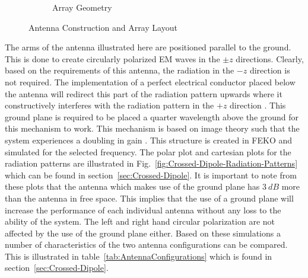 \documentclass[11pt]{witseiepaper}
\begin{document}
\begin{bibunit}[witseie]
\begin{figure}[htb]
\begin{subfigure}{.3\textwidth}
            \caption{Array Geometry}
            \label{fig:ArrayGeometry}  
            \end{subfigure}
\caption{Antenna Construction and Array Layout}
\label{fig:AntennaConstructionArrayLayout}
\end{figure}
The arms of the antenna illustrated here are positioned parallel to the ground. This is done to create circularly polarized EM waves in the $\pm z$ directions.
Clearly, based on the requirements of this antenna, the radiation in the $-z$ direction is not required. The implementation of a perfect electrical conductor placed below the antenna will redirect this part of the radiation pattern upwards where it constructively interferes with the radiation pattern in the $+z$ direction \cite[p.~110-111]{IEEECrossedDipole}. This ground plane is required to be placed a quarter wavelength above the ground for this mechanism to work. This mechanism is based on image theory such that the system experiences a doubling in gain \cite[p.~111]{IEEECrossedDipole}. This structure is created in FEKO \cite{FEKO} and simulated for the selected frequency. The polar plot and cartesian plots for the radiation patterns are illustrated in Fig.~\ref{fig:Crossed-Dipole-Radiation-Patterns} which can be found in section~\ref{sec:Crossed-Dipole}. It is important to note from these plots that the antenna which makes use of the ground plane has $3~dB$ more than the antenna in free space. This implies that the use of a ground plane will increase the performance of each individual antenna without any loss to the ability of the system. The left and right hand circular polarization are not affected by the use of the ground plane either. Based on these simulations a number of characteristics of the two antenna configurations can be compared. This is illustrated in table~\ref{tab:AntennaConfigurations} which is found in section~\ref{sec:Crossed-Dipole}.



\end{bibunit}
\end{document}
